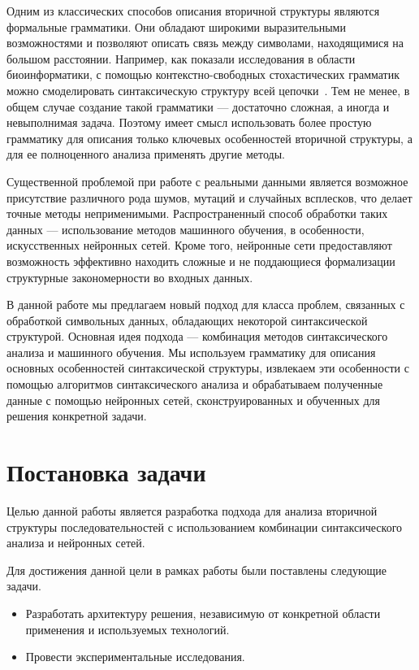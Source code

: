 Одним из классических способов описания вторичной структуры являются формальные грамматики. Они обладают широкими выразительными возможностями и позволяют описать связь между символами, находящимися на большом расстоянии. Например, как показали исследования в области биоинформатики, с помощью контекстно-свободных стохастических грамматик можно смоделировать синтаксическую структуру всей цепочки~\cite{dowell2004rna,PCFG}. Тем не менее, в общем случае создание такой грамматики --- достаточно сложная, а иногда и невыполнимая задача. Поэтому имеет смысл использовать более простую грамматику для описания только ключевых особенностей вторичной структуры, а для ее полноценного анализа применять другие методы.

Существенной проблемой при работе с реальными данными является возможное присутствие различного рода шумов, мутаций и случайных всплесков, что делает точные методы неприменимыми. Распространенный способ обработки таких данных --- использование методов машинного обучения, в особенности, искусственных нейронных сетей. Кроме того, нейронные сети предоставляют возможность эффективно находить сложные и не поддающиеся формализации структурные закономерности во входных данных.

В данной работе мы предлагаем новый подход для класса проблем, связанных с обработкой символьных данных, обладающих некоторой синтаксической структурой. Основная идея подхода --- комбинация методов синтаксического анализа и машинного обучения. Мы используем грамматику для описания основных особенностей синтаксической структуры, извлекаем эти особенности с помощью алгоритмов синтаксического анализа и обрабатываем полученные данные с помощью нейронных сетей, сконструированных и обученных для решения конкретной задачи.

\section{Постановка задачи}
Целью данной работы является разработка подхода для анализа вторичной структуры последовательностей с использованием комбинации синтаксического анализа и нейронных сетей.

Для достижения данной цели в рамках работы были поставлены следующие задачи.
\begin{itemize}
    \item Разработать архитектуру решения, независимую от конкретной области применения и используемых технологий.
    \item Провести экспериментальные исследования.
\end{itemize}

